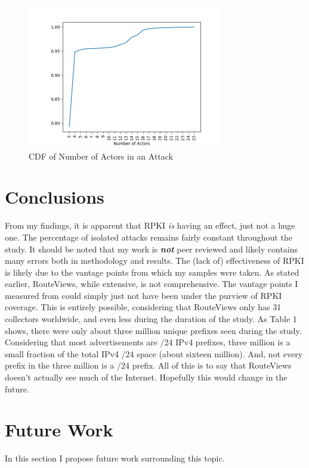 \begin{figure}[tp]
    \begin{center}
        \includegraphics[width=\textwidth, height=2.5in, keepaspectratio]{figures/attacks-cdf.png}
    \end{center}
    \caption{CDF of Number of Actors in an Attack}
\end{figure}

\section{Conclusions}
From my findings, it is apparent that RPKI {\em is} having an effect, just not a
huge one. The percentage of isolated attacks remains fairly constant throughout
the study. It should be noted that my work is {\em {\bf not}} peer reviewed and
likely contains many errors both in methodology and results. The (lack of)
effectiveness of RPKI is likely due to the vantage points from which my samples
were taken. As stated earlier, RouteViews, while extensive, is not
comprehensive.  The vantage points I measured from could simply just not have
been under the purview of RPKI coverage. This is entirely possible, considering
that RouteViews only has 31 collectors worldwide, and even less during the
duration of the study. As Table 1 shows, there were only about three million
unique prefixes seen during the study. Considering that most advertisements are
/24 IPv4 prefixes, three million is a small fraction of the total IPv4 /24 space
(about sixteen million). And, not every prefix in the three million is a /24
prefix.  All of this is to say that RouteViews doesn't actually see much of the
Internet.  Hopefully this would change in the future.

\section{Future Work}
In this section I propose future work surrounding this topic.

